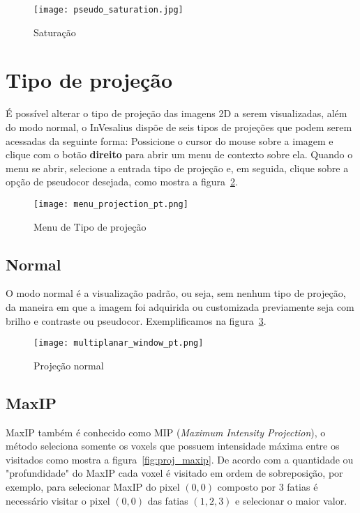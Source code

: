 \begin{figure}[H]
\centering
\texttt{[image: pseudo\_saturation.jpg]}
\caption{Saturação}
\label{fig:image_saturation}
\end{figure}

\newpage

\section{Tipo de projeção}

É possível alterar o tipo de projeção das imagens 2D a serem visualizadas, além do modo normal, o InVesalius dispõe de seis tipos de projeções que podem serem acessadas da seguinte forma: Possicione o cursor do mouse sobre a imagem e clique com o botão \textbf{direito} para abrir um menu de contexto sobre ela. Quando o menu se abrir, selecione a entrada tipo de projeção e, em seguida, clique sobre a opção de pseudocor desejada, como mostra a figura~\ref{fig:menu_proj}.

\begin{figure}[H]
\centering
\texttt{[image: menu\_projection\_pt.png]}
\caption{Menu de Tipo de projeção}
\label{fig:menu_proj}
\end{figure}

\subsection{Normal}

O modo normal é a visualização padrão, ou seja, sem nenhum tipo de projeção, da maneira em que a imagem foi adquirida ou customizada previamente seja com brilho e contraste ou pseudocor. Exemplificamos na figura~\ref{fig:proj_normal}.

\begin{figure}[H]
\centering
\texttt{[image: multiplanar\_window\_pt.png]}
\caption{Projeção normal}
\label{fig:proj_normal}
\end{figure}

\subsection{MaxIP}
\label{sec:max_ip}
MaxIP também é conhecido como MIP (\textit{Maximum Intensity Projection}), o método seleciona somente os voxels que possuem intensidade máxima entre os visitados como mostra a figura~\ref{fig:proj_maxip}. De acordo com a quantidade ou "profundidade" do MaxIP cada voxel é visitado em ordem de sobreposição, por exemplo, para selecionar MaxIP do pixel $(0,0)$ composto por 3 fatias é necessário visitar o pixel $(0,0)$ das fatias $(1,2,3)$ e selecionar o maior valor.

